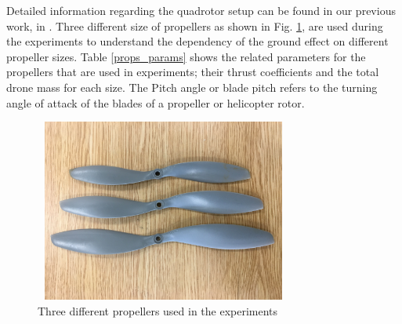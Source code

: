 \documentclass[twocolumn,10pt]{asme2ej}
\begin{document}
Detailed information regarding the quadrotor setup can be found in our previous work, in \cite{DenaRuiz2017}. Three different size of propellers as shown in Fig. \ref{props}, are used during the experiments to understand the dependency of the ground effect on different propeller sizes. Table \ref{props_params} shows the related parameters for the propellers that are used in experiments; their thrust coefficients and the total drone mass for each size. The Pitch angle or blade pitch refers to the turning angle of attack of the blades of a propeller or helicopter rotor.

\begin{figure}[t]
    \begin{center}
        \setlength{\unitlength}{0.012500in}%
        \includegraphics[width=8.5cm, height=6cm]{Images/props.eps}
    \end{center}
    \caption{Three different propellers used in the experiments}
    \label{props}
\end{figure} 

\begin{table}[t]
    \small
    \caption{Propeller characteristics and their thrust coefficients}
    \begin{center}
    \label{props_params}
    \end{center}
\end{table}
\end{document}
